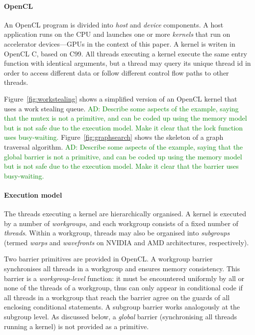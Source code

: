 \documentclass[nocopyrightspace]{sigplanconf-pldi16}
\newcommand{\ADComment}[1]{\textcolor{green}{AD: #1}}
\begin{document}
\paragraph{OpenCL}
An OpenCL program is divided into \emph{host} and \emph{device}
components.  A host application runs on the CPU and launches one or
more \emph{kernels} that run on accelerator devices---GPUs in the
context of this paper.  A kernel is writen in OpenCL C, based on C99.
All threads executing a kernel execute the same entry function with
identical arguments, but a thread may query its unique thread id in
order to access different data or follow different control flow paths
to other threads.

Figure~\ref{fig:workstealing} shows a simplified version of an OpenCL
kernel that uses a work stealing queue.  \ADComment{Describe some
  aspects of the example, saying that the mutex is not a primitive,
  and can be coded up using the memory model but is not safe due to
  the execution model.  Make it clear that the lock function uses busy-waiting.}  Figure~\ref{fig:graphsearch} shows the
skeleton of a graph traversal algorithm.  \ADComment{Describe some
  aspects of the example, saying that the global barrier is not a
  primitive, and can be coded up using the memory model but is not
  safe due to the execution model.  Make it clear that the barrier uses busy-waiting.}

\paragraph{Execution model}

The threads executing a kernel are hierarchically organised.  A kernel
is executed by a number of \emph{workgroups}, and each workgroup
consists of a fixed number of \emph{threads}.  Within a workgroup,
threads may also be organised into \emph{subgroups} (termed
\emph{warps} and \emph{wavefronts} on NVIDIA and AMD architectures,
respectively).

Two barrier primitives are provided in OpenCL.  A workgroup barrier
synchronises all threads in a workgroup and ensures memory
consistency.  This barrier is a \emph{workgroup-level} function: it
must be encountered uniformly by all or none of the threads of a
workgroup, thus can only appear in conditional code if all threads in
a workgroup that reach the barrier agree on the guards of all
enclosing conditional statements.  A subgroup barrier works
analogously at the subgroup level.  As discussed below, a
\emph{global} barrier (synchronising all threads running a kernel) is
not provided as a primitive.
\end{document}

